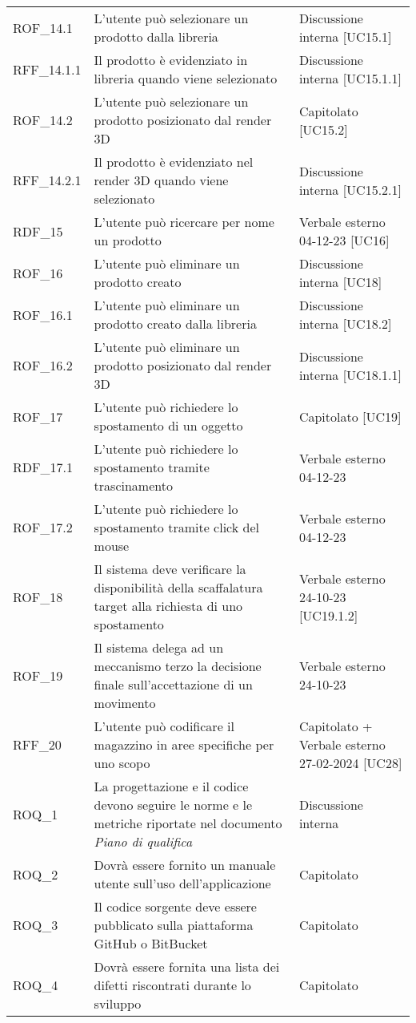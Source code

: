 \begin{xltabular}{\textwidth}{ p{0.2\textwidth} | X | p{0.2\textwidth} }
    ROF\_14.1& L'utente può selezionare un prodotto dalla libreria & Discussione interna [UC15.1]\\
    RFF\_14.1.1& Il prodotto è evidenziato in libreria quando viene selezionato & Discussione interna [UC15.1.1]\\
    ROF\_14.2& L'utente può selezionare un prodotto posizionato dal render 3D & Capitolato [UC15.2]\\
    RFF\_14.2.1& Il prodotto è evidenziato nel render 3D quando viene selezionato & Discussione interna [UC15.2.1]\\
    RDF\_15& L'utente può ricercare per nome un prodotto & Verbale esterno 04-12-23 [UC16]\\
    ROF\_16& L'utente può eliminare un prodotto creato & Discussione interna [UC18]\\
    ROF\_16.1& L'utente può eliminare un prodotto creato dalla libreria & Discussione interna [UC18.2]\\
    ROF\_16.2& L'utente può eliminare un prodotto posizionato dal render 3D & Discussione interna [UC18.1.1]\\
    ROF\_17& L'utente può richiedere lo spostamento di un oggetto & Capitolato [UC19]\\
    RDF\_17.1& L'utente può richiedere lo spostamento tramite trascinamento & Verbale esterno 04-12-23\\
    ROF\_17.2& L'utente può richiedere lo spostamento tramite click del mouse & Verbale esterno 04-12-23\\
    ROF\_18& Il sistema deve verificare la disponibilità della scaffalatura target alla richiesta di uno spostamento & Verbale esterno 24-10-23 [UC19.1.2]\\
    ROF\_19 & Il sistema delega ad un meccanismo terzo la decisione finale sull'accettazione di un movimento & Verbale esterno 24-10-23\\
    RFF\_20 & L'utente può codificare il magazzino in aree specifiche per uno scopo & Capitolato + Verbale esterno 27-02-2024 [UC28] \\
    ROQ\_1& La progettazione e il codice devono seguire le norme e le metriche riportate nel documento \textit{Piano di qualifica} & Discussione interna \\
    ROQ\_2& Dovrà essere fornito un manuale utente sull'uso dell'applicazione & Capitolato \\
    ROQ\_3& Il codice sorgente deve essere pubblicato sulla piattaforma GitHub o BitBucket & Capitolato \\
    ROQ\_4& Dovrà essere fornita una lista dei difetti riscontrati durante lo sviluppo & Capitolato  \\

\end{xltabular}
